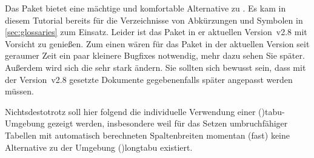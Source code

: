 \documentclass[%
  english,ngerman,%
  cdgeometry=no,DIV=12,%
  cd=false,cdfont=false,cdtitle=true,%
  headings=normal,%
  automark,%
  listof=toc,%
]{tudscrartcl}
\begin{document}
Das Paket  bietet eine mächtige und komfortable Alternative zu 
. Es kam in diesem Tutorial bereits für die Verzeichnisse von 
Abkürzungen und Symbolen in \autoref{sec:glossaries} zum Einsatz. Leider ist 
das Paket in er aktuellen Version~v2.8 mit Vorsicht zu genießen. Zum einen
wären für das Paket in der aktuellen Version seit geraumer Zeit ein paar 
kleinere Bugfixes notwendig, mehr dazu sehen Sie später. Außerdem wird sich die 
sehr stark ändern. Sie sollten sich bewusst sein, dass mit der Version~v2.8
gesetzte Dokumente gegebenenfalls später angepasst werden müssen.

Nichtsdestotrotz soll hier folgend die individuelle Verwendung einer 
\Environment(){tabu}-Umgebung gezeigt werden, insbesondere weil 
für das Setzen umbruchfähiger Tabellen mit automatisch berechneten 
Spaltenbreiten momentan (fast) keine Alternative zu der Umgebung 
\Environment(){longtabu} existiert. 
\end{document}
